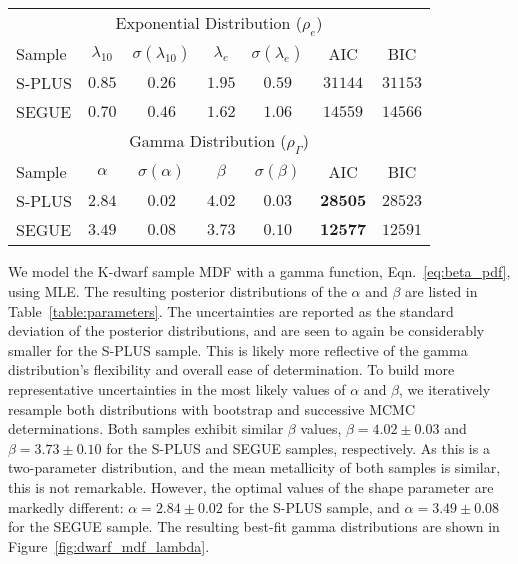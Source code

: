 \documentclass[twocolumn,trackchanges]{aastex63}
\begin{document}
\begin{table*}
	\caption{Maximum Likelihood Parameter Estimates for K-dwarf Sample Metallicity Distributions}             %
	\label{table:parameters}      %
	\centering                          %
	\begin{tabular}{l c c c c c c}        %
		\hline\hline                  %
 
        \multicolumn{7}{c}{Exponential Distribution ($\rho_{e}$)} \\
        Sample & $\lambda_{10}$ & $\sigma(\lambda_{10})$ & $\lambda_e$ & $\sigma(\lambda_e)$  & AIC & BIC \\
        \hline
        S-PLUS              & $0.85$   & $0.26$   & $1.95$    &  $ 0.59$  &   $31144$  & $31153$  \\
        SEGUE                 & $0.70$   & $0.46$   & $1.62$   &  $1.06$   &   $14559$  & $14566$ \\
        \hline
        
        \multicolumn{7}{c}{Gamma Distribution ($\rho_{\Gamma}$)} \\
        Sample & $\alpha$ & $\sigma(\alpha)$ & $\beta$ & $\sigma(\beta)$  & AIC & BIC \\
        \hline
        S-PLUS               &    $2.84$     &   $0.02$    &  $4.02$    & $0.03$   & $\mathbf{28505}$  &  $28523$   \\
        SEGUE                 &    $3.49$    &   $0.08$     &  $3.73$     & $0.10$  &  $\mathbf{12577}$  &  $12591$     \\
        \hline        

		\hline                                   %
	\end{tabular}

\end{table*}

We model the K-dwarf sample MDF with a gamma function, Eqn.~\ref{eq:beta_pdf}, using MLE. The resulting posterior distributions of the $\alpha$ and $\beta$ are listed in Table~\ref{table:parameters}. The uncertainties are reported as the standard deviation of the posterior distributions, and are seen to again be considerably smaller for the S-PLUS sample. This is likely more reflective of the gamma distribution's flexibility and overall ease of determination. To build more representative uncertainties in the most likely values of $\alpha$ and $\beta$, we iteratively resample both distributions with bootstrap and successive MCMC determinations. Both samples exhibit similar $\beta$ values, $\beta = 4.02 \pm 0.03$ and $\beta= 3.73 \pm 0.10$ for the S-PLUS and SEGUE samples, respectively. As this is a two-parameter distribution, and the mean metallicity of both samples is similar, this is not remarkable. However, the optimal values of the shape parameter are markedly different: $\alpha = 2.84 \pm 0.02$ for the S-PLUS sample, and $\alpha=3.49 \pm 0.08$ for the SEGUE sample. The resulting best-fit gamma distributions are shown in Figure~\ref{fig:dwarf_mdf_lambda}.
\end{document}
